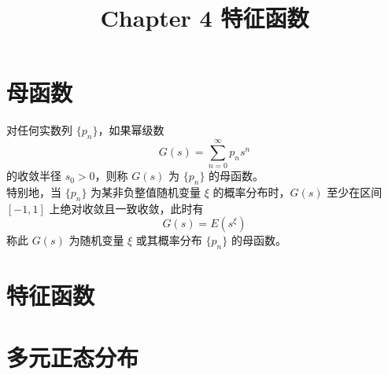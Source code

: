 \documentclass[12pt,a4paper]{amsart}
\title{Chapter 4 特征函数}
\begin{document}
\maketitle\cite{杨振明2007}

\section{母函数}

\begin{definition}[母函数]
    对任何实数列 $\{p_n\}$，如果幂级数
    \begin{equation}
        G(s) = \sum_{n=0}^{\infty} p_n s^n
    \end{equation}
    的收敛半径 $s_0 > 0$，则称 $G(s)$ 为 $\{p_n\}$ 的母函数。 \\
    特别地，当 $\{p_n\}$ 为某非负整值随机变量 $\xi$ 的概率分布时，$G(s)$ 至少在区间 $[-1, 1]$ 上绝对收敛且一致收敛，此时有
    \begin{equation}
        G(s) = E(s^\xi)
    \end{equation}
    称此 $G(s)$ 为随机变量 $\xi$ 或其概率分布 $\{p_n\}$ 的母函数。
\end{definition}

\section{特征函数}

\section{多元正态分布}

\appendix


{\footnotesize}
\end{document}
